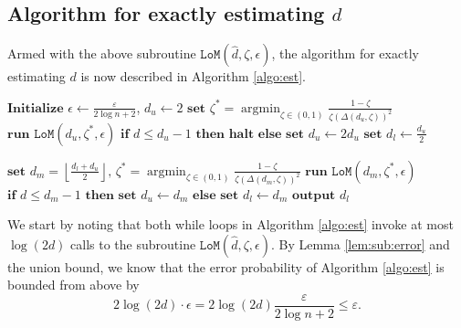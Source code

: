\documentclass[onecolumn,letterpaper]{IEEEtran}
\DeclareMathOperator*{\argmin}{argmin}
\newtheorem{lemma}{Lemma}
\newcommand{\cO}{{\cal O}}
\newcommand{\lom}{{\texttt{LoM}}}
\newcommand{\lomerr}{{\epsilon}}
\newcommand{\ud}{{\hat{d}}}
\newcommand{\lomcp}{{\zeta}}
\newcommand{\esterr}{{\varepsilon}}
\newcommand{\dup}{{d_u}}
\newcommand{\dlw}{{d_l}}
\newcommand{\dmd}{{d_m}}
\newcommand{\lomcps}{{\lomcp^*}}
\newcommand{\lompgapup}{{\Delta(\dup,\lomcp)}}
\newcommand{\lompgapmd}{{\Delta(\dmd,\lomcp)}}
\begin{document}
\subsection{Algorithm for exactly estimating $d$}
Armed with the above subroutine $\lom(\ud,\lomcp,\lomerr)$, the algorithm for exactly estimating $d$ is now described in Algorithm \ref{algo:est}. 
\begin{algorithm}
    \caption{Exact estimation of $d$}\label{algo:est}
    \begin{algorithmic}[1]
    \State $\textbf{Initialize } \lomerr \gets \frac{\esterr}{2\log n + 2}$, $\dup \gets 2$
        \State $\textbf{set } \lomcps = \argmin_{\lomcp\in(0,1)} \frac{1-\lomcp}{\lomcp (\lompgapup)^2}$
        \State $\textbf{run } \lom(\dup,\lomcps,\lomerr)$
        \State $\textbf{if } d \le \dup-1 \textbf{ then halt}$
        \State $\textbf{else set } \dup \gets 2\dup$
    \EndWhile
    \State $\textbf{set } \dlw \gets \frac{\dup}{2}$

    \While{$\dup - \dlw \ge 2$}
        \State $\textbf{set } \dmd = \left\lfloor \frac{\dlw+\dup}{2} \right\rfloor \text{, } \lomcps = \argmin_{\lomcp\in(0,1)} \frac{1-\lomcp}{\lomcp (\lompgapmd)^2}$
        \State $\textbf{run } \lom(\dmd,\lomcps,\lomerr)$
        \State $\textbf{if } d \le \dmd-1 \textbf{ then set } \dup \gets \dmd$
        \State $\textbf{else set } \dlw \gets \dmd$
    \EndWhile
    \State $\textbf{output } \dlw$
    \end{algorithmic}
\end{algorithm}


We start by noting that both while loops in Algorithm \ref{algo:est} invoke at most $\log (2d)$ calls to the subroutine $\lom(\ud,\lomcp,\lomerr)$. By Lemma \ref{lem:sub:error} and the union bound, we know that the error probability of Algorithm \ref{algo:est} is bounded from above by $$2 \log (2d) \cdot \lomerr =2 \log (2d)\frac{\esterr}{2\log n + 2}\le \esterr.$$
\end{document}
